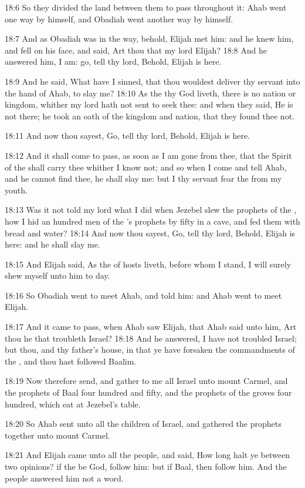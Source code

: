 18:6 So they divided the land between them to pass throughout it: Ahab
went one way by himself, and Obadiah went another way by himself.

18:7 And as Obadiah was in the way, behold, Elijah met him: and he
knew him, and fell on his face, and said, Art thou that my lord
Elijah?  18:8 And he answered him, I am: go, tell thy lord, Behold,
Elijah is here.

18:9 And he said, What have I sinned, that thou wouldest deliver thy
servant into the hand of Ahab, to slay me?  18:10 As the \LORD thy God
liveth, there is no nation or kingdom, whither my lord hath not sent
to seek thee: and when they said, He is not there; he took an oath of
the kingdom and nation, that they found thee not.

18:11 And now thou sayest, Go, tell thy lord, Behold, Elijah is here.

18:12 And it shall come to pass, as soon as I am gone from thee, that
the Spirit of the \LORD shall carry thee whither I know not; and so
when I come and tell Ahab, and he cannot find thee, he shall slay me:
but I thy servant fear the \LORD from my youth.

18:13 Was it not told my lord what I did when Jezebel slew the
prophets of the \LORD, how I hid an hundred men of the \LORD's prophets
by fifty in a cave, and fed them with bread and water?  18:14 And now
thou sayest, Go, tell thy lord, Behold, Elijah is here: and he shall
slay me.

18:15 And Elijah said, As the \LORD of hosts liveth, before whom I
stand, I will surely shew myself unto him to day.

18:16 So Obadiah went to meet Ahab, and told him: and Ahab went to
meet Elijah.

18:17 And it came to pass, when Ahab saw Elijah, that Ahab said unto
him, Art thou he that troubleth Israel?  18:18 And he answered, I have
not troubled Israel; but thou, and thy father's house, in that ye have
forsaken the commandments of the \LORD, and thou hast followed Baalim.

18:19 Now therefore send, and gather to me all Israel unto mount
Carmel, and the prophets of Baal four hundred and fifty, and the
prophets of the groves four hundred, which eat at Jezebel's table.

18:20 So Ahab sent unto all the children of Israel, and gathered the
prophets together unto mount Carmel.

18:21 And Elijah came unto all the people, and said, How long halt ye
between two opinions? if the \LORD be God, follow him: but if Baal,
then follow him. And the people answered him not a word.

